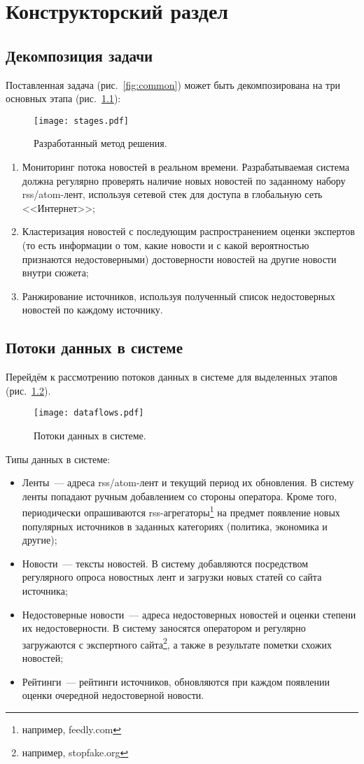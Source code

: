 \chapter{Конструкторский раздел}
\section{Декомпозиция задачи}
Поставленная задача (рис.~\ref{fig:common}) может быть декомпозирована на три основных этапа (рис.~\ref{fig:stages}):
\begin{figure}[h]
    \centering
    \texttt{[image: stages.pdf]}
    \caption{Разработанный метод решения.}
    \label{fig:stages}
\end{figure}

\begin{enumerate}
    \item Мониторинг потока новостей в реальном времени. Разрабатываемая система должна регулярно проверять наличие новых новостей по заданному набору rss/atom-лент, используя сетевой стек для доступа в глобальную сеть <<Интернет>>;
    \item Кластеризация новостей с последующим распространением оценки экспертов (то есть информации о том, какие новости и с какой вероятностью признаются недостоверными) достоверности новостей на другие новости внутри сюжета;
    \item Ранжирование источников, используя полученный список недостоверных новостей по каждому источнику.
\end{enumerate}

\section{Потоки данных в системе}
Перейдём к рассмотрению потоков данных в системе для выделенных этапов (рис.~\ref{fig:dataflows}).
\begin{figure}[h]
    \centering
    \texttt{[image: dataflows.pdf]}
    \caption{Потоки данных в системе.}
    \label{fig:dataflows}
\end{figure}

Типы данных в системе:
\begin{itemize}
    \item Ленты~--- адреса rss/atom-лент и текущий период их обновления. В систему ленты попадают ручным добавлением со стороны оператора. Кроме того, периодически опрашиваются rss-агрегаторы\footnote{например, feedly.com} на предмет появление новых популярных источников в заданных категориях (политика, экономика и другие);
    \item Новости~--- тексты новостей. В систему добавляются посредством регулярного опроса новостных лент и загрузки новых статей со сайта источника;
    \item Недостоверные новости~--- адреса недостоверных новостей и оценки степени их недостоверности. В систему заносятся оператором и регулярно загружаются с экспертного сайта\footnote{например, stopfake.org}, а также в результате пометки схожих новостей;
    \item Рейтинги~--- рейтинги источников, обновляются при каждом появлении оценки очередной недостоверной новости.
\end{itemize}


